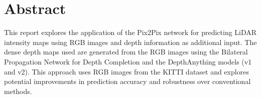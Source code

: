 \section*{Abstract}
This report explores the application of the Pix2Pix network for predicting LiDAR intensity maps using RGB images and depth information as additional input. The dense depth maps used are generated from the RGB images using the Bilateral Propagation Network for Depth Completion and the DepthAnything models (v1 and v2). This approach uses RGB images from the KITTI dataset and explores potential improvements in prediction accuracy and robustness over conventional methods.